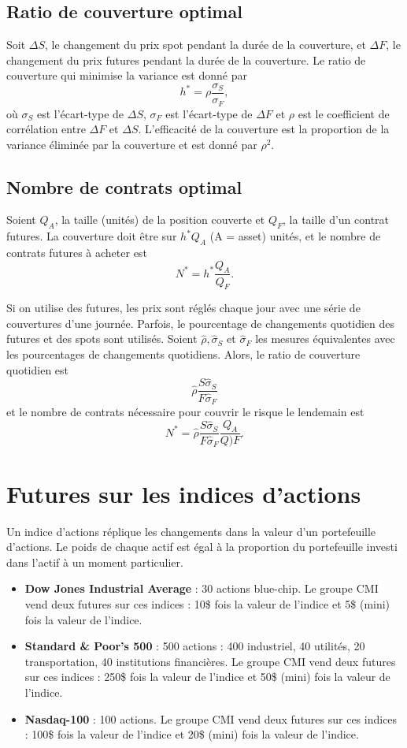 \subsection{Ratio de couverture optimal}

Soit $\Delta S$, le changement du prix spot pendant la durée de la couverture, et $\Delta F$, le changement du prix futures pendant la durée de la couverture. Le ratio de couverture qui minimise la variance est donné par $$h^* = \rho \frac{\sigma_S}{\sigma_F},$$ où $\sigma_S$ est l'écart-type de $\Delta S$, $\sigma_F$ est l'écart-type de $\Delta F$ et $\rho$ est le coefficient de corrélation entre $\Delta F$ et $\Delta S$. L'efficacité de la couverture est la proportion de la variance éliminée par la couverture et est donné par $\rho^2$. 

\subsection{Nombre de contrats optimal}

Soient $Q_A$, la taille (unités) de la position couverte et $Q_F$, la taille d'un contrat futures. La couverture doit être sur $h^* Q_A$ (A = asset) unités, et le nombre de contrats futures à acheter est 
$$N^* = h^* \frac{Q_A}{Q_F}.$$

Si on utilise des futures, les prix sont réglés chaque jour avec une série de couvertures d'une journée. Parfois, le pourcentage de changements quotidien des futures et des spots sont utilisés. Soient $\hat{\rho}, \hat{\sigma}_S$ et $\hat{\sigma}_F$ les mesures équivalentes avec les pourcentages de changements quotidiens. Alors, le ratio de couverture quotidien est 
$$\hat{\rho} \frac{S \hat{\sigma}_S}{F \hat{\sigma}_F}$$
et le nombre de contrats nécessaire pour couvrir le risque le lendemain est 
$$N^* = \hat{\rho} \frac{S \hat{\sigma}_S}{F \hat{\sigma}_F} \frac{Q_A}{Q)F}.$$

\section{Futures sur les indices d'actions}

Un indice d'actions réplique les changements dans la valeur d'un portefeuille d'actions. Le poids de chaque actif est égal à la proportion du portefeuille investi dans l'actif à un moment particulier. 

\begin{itemize}
	\item \textbf{Dow Jones Industrial Average} : 30 actions blue-chip. Le groupe CMI vend deux futures sur ces indices : 10\$ fois la valeur de l'indice et 5\$ (mini) fois la valeur de l'indice. 
	\item \textbf{Standard \& Poor's 500} : 500 actions : 400 industriel, 40 utilités, 20 transportation, 40 institutions financières. Le groupe CMI vend deux futures sur ces indices : 250\$ fois la valeur de l'indice et 50\$ (mini) fois la valeur de l'indice. 
	\item \textbf{Nasdaq-100} : 100 actions. Le groupe CMI vend deux futures sur ces indices : 100\$ fois la valeur de l'indice et 20\$ (mini) fois la valeur de l'indice. 
\end{itemize}

